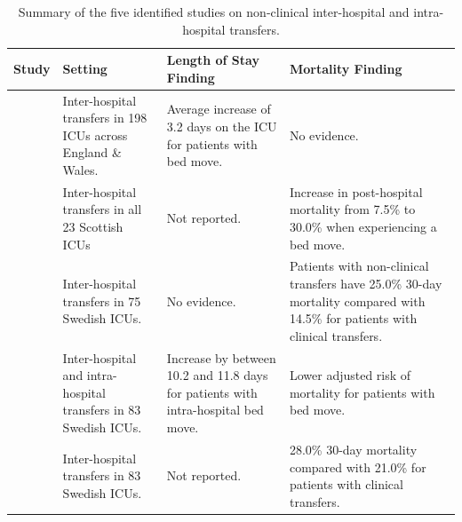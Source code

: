\documentclass{article}
\begin{document}
\begin{table}
\begin{center}
\begin{tabular}{p{}p{}p{}p{}}
\toprule
Study & Setting & Length of Stay Finding & Mortality Finding \\
\midrule
\cite{barratt12} &
Inter-hospital transfers in 198 ICUs across England \& Wales. &
Average increase of 3.2 days on the ICU for patients with bed move. &
No evidence. \\
\addlinespace[1.4em]
\cite{blayney20} &
Inter-hospital transfers in all 23 Scottish ICUs &
Not reported. &
Increase in post-hospital mortality from 7.5\% to 30.0\% when experiencing a bed
move. \\
\addlinespace[1.4em]
\cite{parenmark22} &
Inter-hospital transfers in 75 Swedish ICUs. &
No evidence. &
Patients with non-clinical transfers have 25.0\% 30-day mortality compared with
14.5\% for patients with clinical transfers. \\
\addlinespace[1.4em]
\cite{rylander24} &
Inter-hospital and intra-hospital transfers in 83 Swedish ICUs.
& Increase by between 10.2 and 11.8 days for patients with intra-hospital bed
move. &
Lower adjusted risk of mortality for patients with bed move. \\
\addlinespace[1.4em]
\cite{sternley25} &
Inter-hospital transfers in 83 Swedish ICUs. &
Not reported. &
28.0\% 30-day mortality compared with 21.0\% for patients with clinical
transfers. \\
\bottomrule
\end{tabular}
\end{center}
\caption{Summary of the five identified studies on non-clinical
inter-hospital and intra-hospital transfers.}
\label{tbl:five_studies}
\end{table}
\end{document}
